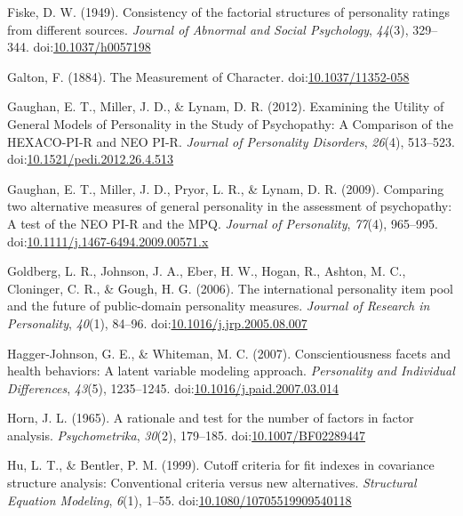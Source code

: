 \documentclass[,man,floatsintext]{apa6}
\begin{document}
\hypertarget{ref-Fiske1949}{}
Fiske, D. W. (1949). Consistency of the factorial structures of
personality ratings from different sources. \emph{Journal of Abnormal
and Social Psychology}, \emph{44}(3), 329--344.
doi:\href{https://doi.org/10.1037/h0057198}{10.1037/h0057198}

\hypertarget{ref-Galton1884}{}
Galton, F. (1884). The Measurement of Character.
doi:\href{https://doi.org/10.1037/11352-058}{10.1037/11352-058}

\hypertarget{ref-Gaughan2012}{}
Gaughan, E. T., Miller, J. D., \& Lynam, D. R. (2012). Examining the
Utility of General Models of Personality in the Study of Psychopathy: A
Comparison of the HEXACO-PI-R and NEO PI-R. \emph{Journal of Personality
Disorders}, \emph{26}(4), 513--523.
doi:\href{https://doi.org/10.1521/pedi.2012.26.4.513}{10.1521/pedi.2012.26.4.513}

\hypertarget{ref-Gaughan2009}{}
Gaughan, E. T., Miller, J. D., Pryor, L. R., \& Lynam, D. R. (2009).
Comparing two alternative measures of general personality in the
assessment of psychopathy: A test of the NEO PI-R and the MPQ.
\emph{Journal of Personality}, \emph{77}(4), 965--995.
doi:\href{https://doi.org/10.1111/j.1467-6494.2009.00571.x}{10.1111/j.1467-6494.2009.00571.x}

\hypertarget{ref-Goldberg2006}{}
Goldberg, L. R., Johnson, J. A., Eber, H. W., Hogan, R., Ashton, M. C.,
Cloninger, C. R., \& Gough, H. G. (2006). The international personality
item pool and the future of public-domain personality measures.
\emph{Journal of Research in Personality}, \emph{40}(1), 84--96.
doi:\href{https://doi.org/10.1016/j.jrp.2005.08.007}{10.1016/j.jrp.2005.08.007}

\hypertarget{ref-Hagger-Johnson2007}{}
Hagger-Johnson, G. E., \& Whiteman, M. C. (2007). Conscientiousness
facets and health behaviors: A latent variable modeling approach.
\emph{Personality and Individual Differences}, \emph{43}(5), 1235--1245.
doi:\href{https://doi.org/10.1016/j.paid.2007.03.014}{10.1016/j.paid.2007.03.014}

\hypertarget{ref-Horn1965}{}
Horn, J. L. (1965). A rationale and test for the number of factors in
factor analysis. \emph{Psychometrika}, \emph{30}(2), 179--185.
doi:\href{https://doi.org/10.1007/BF02289447}{10.1007/BF02289447}

\hypertarget{ref-Hu1999}{}
Hu, L. T., \& Bentler, P. M. (1999). Cutoff criteria for fit indexes in
covariance structure analysis: Conventional criteria versus new
alternatives. \emph{Structural Equation Modeling}, \emph{6}(1), 1--55.
doi:\href{https://doi.org/10.1080/10705519909540118}{10.1080/10705519909540118}
\end{document}
